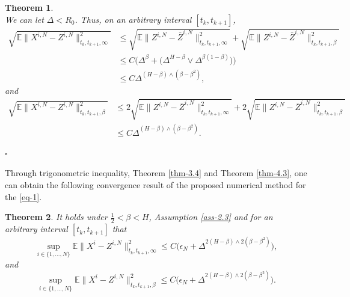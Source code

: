 \documentclass[12pt]{article}
\newtheorem{theorem}{Theorem}[section]
\def\E{\mathbb E}
\newenvironment{proof}{{\noindent\it Proof.}\ }{\hfill $\square$\par}
\numberwithin{equation}{section}
\begin{document}
\begin{theorem}
\begin{proof}
\begin{equation}
		\end{equation}
		We can let $\Delta<R_0$. Thus, on an arbitrary interval $[t_k,t_{k+1}]$,
		\begin{equation}
			\begin{aligned}
				\sqrt{\E\|X^{i,N}- Z^{i,N}\|^2_{t_k,t_{k+1},\infty}}&\leq \sqrt{\E\|Z^{i,N}-\bar Z^{i,N}\|^2_{t_k,t_{k+1},\infty}}+\sqrt{\E\|Z^{i,N}-\bar Z^{i,N}\|^2_{t_k,t_{k+1},\beta}}\\
				&\leq C\Big( \Delta^{\beta}+\Big(\Delta^{H-\beta}\vee \Delta^{\beta(1-\beta)}\Big)\Big)\\
				&\leq C\Delta^{(H-\beta)\wedge (\beta-\beta^2)},
			\end{aligned}
		\end{equation}
		and \begin{equation}
			\begin{aligned}
				\sqrt{\E\|X^{i,N}- Z^{i,N}\|^2_{t_k,t_{k+1},\beta}}&\leq 2\sqrt{\E\|Z^{i,N}-\bar Z^{i,N}\|^2_{t_k,t_{k+1},\infty}}+2\sqrt{\E\|Z^{i,N}-\bar Z^{i,N}\|^2_{t_k,t_{k+1},\beta}}\\
				&\leq C\Delta^{(H-\beta)\wedge (\beta-\beta^2)}.
			\end{aligned}
		\end{equation}
			
	\end{proof}
\end{theorem}

Through trigonometric inequality, Theorem \ref{thm-3.4} and Theorem \ref{thm-4.3}, one can obtain the following convergence result of the proposed numerical method for the \eqref{eq-1}.

\begin{theorem}
	It holds under $\frac{1}{2}<\beta<H$, Assumption \ref{ass-2.3} and for an arbitrary interval $[t_k,t_{k+1}]$ that
	\begin{equation}
		\sup_{i\in \{1,...,N\}}\E\|X^i-Z^{i,N}\|^2_{t_k,t_{k+1},\infty}\leq C\Big( \epsilon_N+\Delta^{2(H-\beta)\wedge 2(\beta-\beta^2)}\Big),
	\end{equation}
	and
	\begin{equation}
		\sup_{i\in \{1,...,N\}}\E\|X^i-Z^{i,N}\|^2_{t_k,t_{k+1},\beta}\leq C \big( \epsilon_N+\Delta^{2(H-\beta)\wedge 2(\beta-\beta^2)}\big).
	\end{equation}
\end{theorem}
\end{document}
